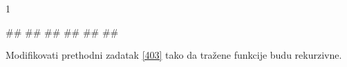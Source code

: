 \begin{Exercise}[label=403]
\begin{miditest}
\begin{test2}{1}
  
#\naslovInt#
##
##
##
## 
##
\end{test2}
\end{miditest}


\end{Exercise}

\begin{Answer}[ref=403]
\end{Answer}
\begin{Exercise}[label=404]
  Modifikovati prethodni zadatak \ref{403} tako da tražene funkcije
  budu rekurzivne.


\end{Exercise}

